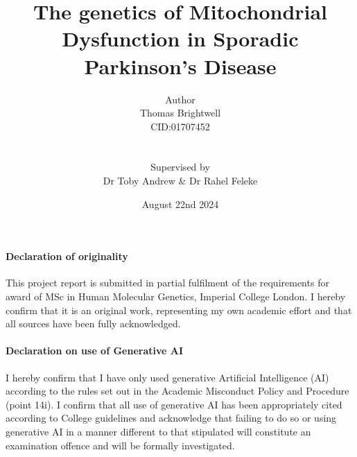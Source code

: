 \documentclass{article}
\title{\textbf{The genetics of Mitochondrial Dysfunction in Sporadic Parkinson's Disease}}
\author{Author
\\Thomas Brightwell
\\CID:01707452
\\
\\
\\Supervised by
\\Dr Toby Andrew & Dr Rahel Feleke}
\date{August 22nd 2024}
\begin{document}
\maketitle
\newpage
\paragraph{Declaration of originality}
This project report is submitted in partial fulfilment of the requirements for award of MSc in Human Molecular Genetics, Imperial College London. I hereby confirm that it is an original work, representing my own academic effort and that all sources have been fully acknowledged.
\paragraph{Declaration on use of Generative AI}
I hereby confirm that I have only used generative Artificial Intelligence (AI) according to the rules set out in the Academic Misconduct Policy and Procedure (point 14i). I confirm that all use of generative AI has been appropriately cited according to College guidelines and acknowledge that failing to do so or using generative AI in a manner different to that stipulated will constitute an examination offence and will be formally investigated.
\newpage
\end{document}
